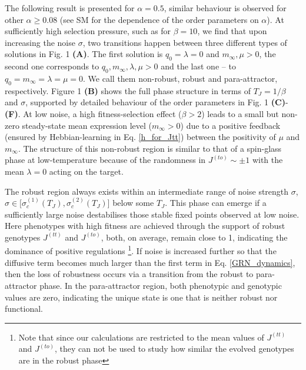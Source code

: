 \documentclass[%
 reprint,
superscriptaddress,
 amsmath,amssymb,
 prl,
]{revtex4-2}
\newcommand{\re}{\color{red}} %
\begin{document}
 The following result is presented for $\alpha=0.5$, similar behaviour is observed for other $\alpha \geq 0.08$ (see SM for the dependence of the order parameters on $\alpha$). At sufficiently high selection pressure, such as for $\beta = 10$,  we find that upon increasing the noise $\sigma$, two transitions happen between three different types  of solutions in Fig. 1  \textbf{(A)}.  The first solution is $q_0=\lambda =0$ and $m_\infty, \mu>0$, the second one corresponds to $q_0,m_\infty, \lambda, \mu >0$ and the last one -- to  $q_0=m_\infty= \lambda =\mu =0$. We call them non-robust, robust and para-attractor, respectively. Figure 1  \textbf{(B)} shows the full phase structure in terms of $T_J = 1/\beta$ and $\sigma$, supported by detailed behaviour of the order parameters in Fig. 1  \textbf{(C)}-  \textbf{(F)}.  %
  At low noise,  a high fitness-selection effect ($\beta > 2$) leads to a small but non-zero  %
steady-state  mean expression level   ($m_\infty>0$)  due to a positive feedback (ensured by Hebbian-learning in Eq. \eqref{h_for_Jtt}) between the  positivity of $\mu$  and $m_\infty$.  %
 The structure of this non-robust region is  similar to that of a spin-glass phase at low-temperature %
 because of the randomness in $J^{(to)}\sim \pm 1$ with the mean $\lambda =0$ acting on the target.   
 
 The robust region always exists within an intermediate range of noise strength $\sigma$, $\sigma \in \big[\sigma_c^{(1)}(T_J), \sigma_c^{(2)}(T_J)\big]$ below some $T_J$.   This phase can emerge if a sufficiently large noise  destabilises those stable fixed points observed at low noise. %
 Here phenotypes with high fitness  are achieved through the support of robust genotypes $J^{(tt)}$ and $J^{(to)}$, both, on average, remain close to 1, indicating the dominance of positive regulations \footnote{Note that since our calculations are restricted to the mean values of $J^{(tt)}$ and  $J^{(to)}$,  they can not be used to study how similar the evolved genotypes are in the robust phase}.  If  noise is increased further so that  the  diffusive term becomes much larger than the first term in Eq. \eqref{GRN_dynamics}, then  the loss of robustness occurs via a transition from the robust to para-attractor phase.
   In the para-attractor region, both phenotypic and genotypic values are zero, indicating the unique state is one that is neither robust nor functional. 
   
\end{document}
